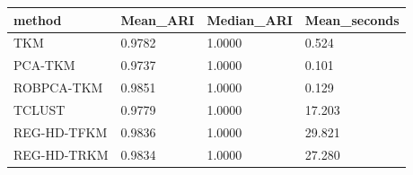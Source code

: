 \begin{tabular}{llll}
\toprule
method & Mean\_ARI & Median\_ARI & Mean\_seconds \\
\midrule
TKM & 0.9782 & 1.0000 & 0.524 \\
PCA-TKM & 0.9737 & 1.0000 & 0.101 \\
ROBPCA-TKM & 0.9851 & 1.0000 & 0.129 \\
TCLUST & 0.9779 & 1.0000 & 17.203 \\
REG-HD-TFKM & 0.9836 & 1.0000 & 29.821 \\
REG-HD-TRKM & 0.9834 & 1.0000 & 27.280 \\
\bottomrule
\end{tabular}
